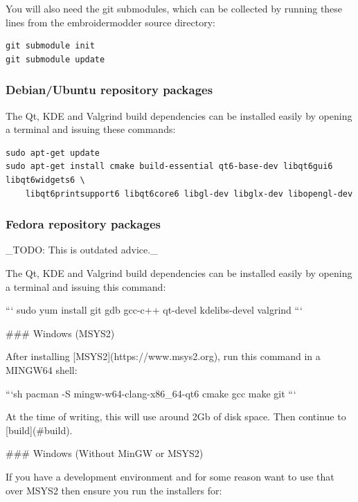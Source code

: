 You will also need the git submodules, which can be collected by running these lines
from the embroidermodder source directory:

\begin{lstlisting}
git submodule init
git submodule update
\end{lstlisting}

\subsubsection{Debian/Ubuntu repository packages}

The Qt, KDE and Valgrind build dependencies can be installed easily by
opening a terminal and issuing these commands:

\begin{lstlisting}
sudo apt-get update
sudo apt-get install cmake build-essential qt6-base-dev libqt6gui6 libqt6widgets6 \
    libqt6printsupport6 libqt6core6 libgl-dev libglx-dev libopengl-dev
\end{lstlisting}

\subsubsection{Fedora repository packages}

_TODO: This is outdated advice._

The Qt, KDE and Valgrind build dependencies can be installed easily
by opening a terminal and issuing this command:

```
sudo yum install git gdb gcc-c++ qt-devel kdelibs-devel valgrind
```

### Windows (MSYS2)

After installing [MSYS2](https://www.msys2.org), run this command in a MINGW64 shell:

```sh
pacman -S mingw-w64-clang-x86_64-qt6 cmake gcc make git
```

At the time of writing, this will use around 2Gb of disk space. Then continue to [build](#build).

### Windows (Without MinGW or MSYS2)

If you have a development environment and for some reason want to use that over MSYS2 then ensure you run the installers for:


